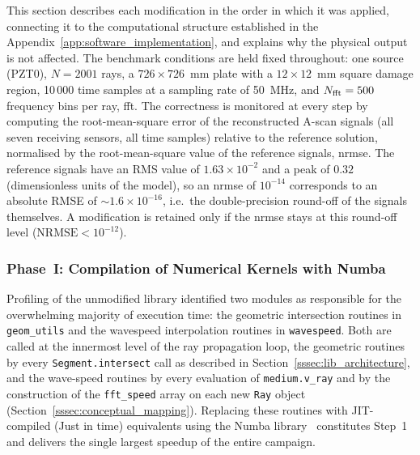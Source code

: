         This section describes each modification in the order in which it was applied, connecting it to the computational structure established in the Appendix~\ref{app:software_implementation}, and explains why the physical output is not affected. The benchmark conditions are held fixed throughout: one source (PZT0), $N = 2001$ rays, a $726 \times 726$~mm plate with a $12 \times 12$~mm square damage region, 10\,000 time samples at a sampling rate of \SI{50}{\mega\hertz}, and $N_{\rm fft} = 500$ frequency bins per ray, \acrfull{fft}. The correctness is monitored at every step by computing the root-mean-square error of the reconstructed A-scan signals (all seven receiving sensors, all time samples) relative to the reference solution, normalised by the root-mean-square value of the reference signals, \acrfull{nrmse}. The reference signals have an RMS value of $1.63\times10^{-2}$ and a peak of $0.32$ (dimensionless units of the model), so an \acrshort{nrmse} of $10^{-14}$ corresponds to an absolute RMSE of $\sim 1.6\times10^{-16}$, i.e.\ the double-precision round-off of the signals themselves. A modification is retained only if the \acrshort{nrmse} stays at this round-off level ($\text{NRMSE} < 10^{-12}$).


        \subsubsection{Phase~I: Compilation of Numerical Kernels with Numba}
        \label{ssec:opt_numba}

            Profiling of the unmodified library identified two modules as responsible for the overwhelming majority of execution time: the geometric intersection routines in \texttt{geom\_utils} and the wavespeed interpolation routines in \texttt{wavespeed}. Both are called at the innermost level of the ray propagation loop, the geometric routines by every \texttt{Segment.intersect} call as described in Section~\ref{sssec:lib_architecture}, and the wave-speed routines by every evaluation of \texttt{medium.v\_ray} and by the construction of the \texttt{fft\_speed} array on each new \texttt{Ray} object (Section~\ref{sssec:conceptual_mapping}). Replacing these routines with JIT-compiled (Just in time) equivalents using the Numba library~\cite{RT_Numba} constitutes Step~1 and delivers the single largest speedup of the entire campaign.

